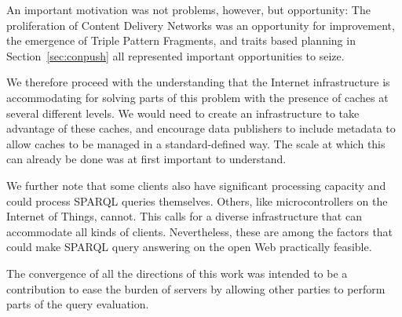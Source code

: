 An important motivation was not problems, however, but opportunity:
The proliferation of Content Delivery Networks was an opportunity for
improvement, the emergence of Triple Pattern Fragments, and traits
based planning in Section~\ref{sec:conpush} all represented important
opportunities to seize.

We therefore proceed with the understanding that the Internet
infrastructure is accommodating for solving parts of this problem with
the presence of caches at several different levels. We would need to
create an infrastructure to take advantage of these caches, and
encourage data publishers to include metadata to allow caches to be
managed in a standard-defined way. The scale at which this can already
be done was at first important to understand.

We further note that some clients also have significant processing
capacity and could process SPARQL queries themselves. Others, like
microcontrollers on the Internet of Things, cannot. This calls for a
diverse infrastructure that can accommodate all kinds of
clients. Nevertheless, these are among the factors that
could make SPARQL query answering on the open Web practically
feasible. 

The convergence of all the directions of this work was intended to be
a contribution to ease the burden of servers by allowing other parties
to perform parts of the query evaluation.



